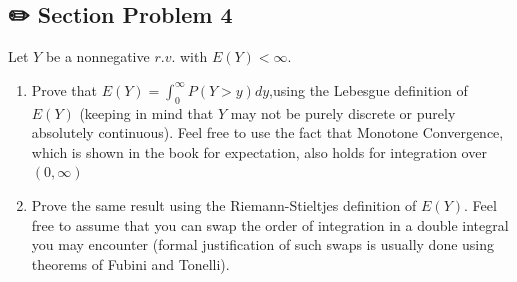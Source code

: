 \documentclass[
  letterpaper,
  DIV=11,
  numbers=noendperiod]{scrreprt}
\theoremstyle{definition}
\theoremstyle{plain}
\theoremstyle{remark}
\begin{document}
\hypertarget{section-problem-4-3}{%
\subsection*{✏️ Section Problem 4}\label{section-problem-4-3}}

Let \(Y\) be a nonnegative \(r.v.\) with \(E(Y)< \infty\).

\begin{enumerate}
\def\labelenumi{(\alph{enumi})}
\item
  Prove that \(E(Y) =\int_0^\infty P(Y > y)dy\),using the Lebesgue
  definition of \(E(Y)\) (keeping in mind that \(Y\) may not be purely
  discrete or purely absolutely continuous). Feel free to use the fact
  that Monotone Convergence, which is shown in the book for expectation,
  also holds for integration over \((0,\infty)\)
\item
  Prove the same result using the Riemann-Stieltjes definition of
  \(E(Y)\). Feel free to assume that you can swap the order of
  integration in a double integral you may encounter (formal
  justification of such swaps is usually done using theorems of Fubini
  and Tonelli).
\end{enumerate}
\end{document}
